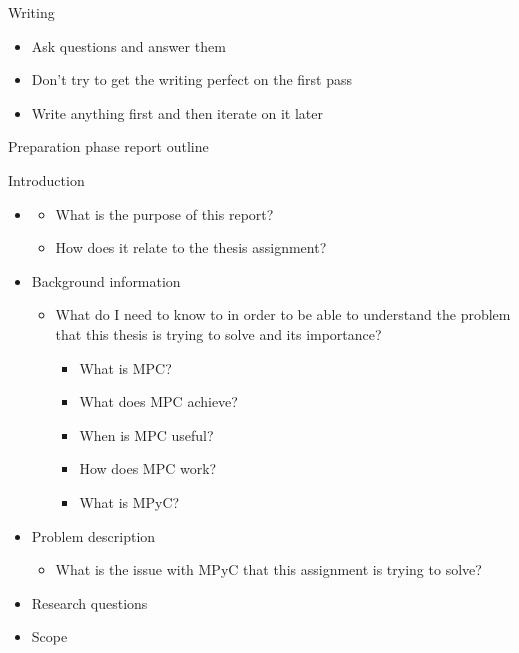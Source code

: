 \begin{frame}{Writing}
\protect\hypertarget{writing}{}
\begin{itemize}
\tightlist
\item
  Ask questions and answer them
\item
  Don't try to get the writing perfect on the first pass
\item
  Write anything first and then iterate on it later
\end{itemize}
\end{frame}

\begin{frame}{Preparation phase report outline}
\protect\hypertarget{preparation-phase-report-outline}{}
\begin{block}{Introduction}
\protect\hypertarget{introduction}{}
\begin{itemize}
\item
  \begin{itemize}
  \tightlist
  \item
    What is the purpose of this report?
  \item
    How does it relate to the thesis assignment?
  \end{itemize}
\item
  Background information

  \begin{itemize}
  \tightlist
  \item
    What do I need to know to in order to be able to understand the
    problem that this thesis is trying to solve and its importance?

    \begin{itemize}
    \tightlist
    \item
      What is MPC?
    \item
      What does MPC achieve?
    \item
      When is MPC useful?
    \item
      How does MPC work?
    \item
      What is MPyC?
    \end{itemize}
  \end{itemize}
\item
  Problem description

  \begin{itemize}
  \tightlist
  \item
    What is the issue with MPyC that this assignment is trying to solve?
  \end{itemize}
\item
  Research questions
\item
  Scope
\end{itemize}
\end{block}


\end{frame}
